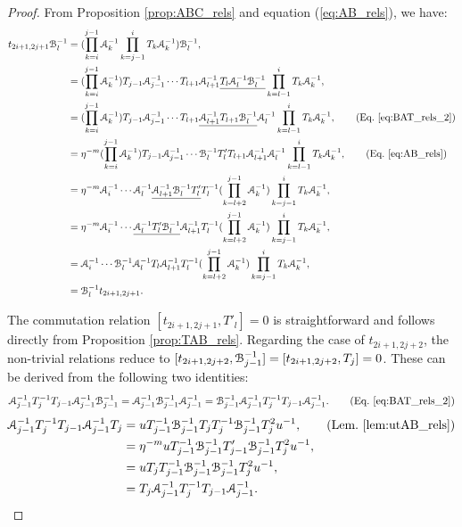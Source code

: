 \documentclass{amsart}
\begin{document}
\begin{proof}
From Proposition \ref{prop:ABC_rels} and equation (\ref{eq:AB_rels}), we have:
\[
\begin{aligned}
t_{2i+1,2j+1}\mathcal{B}^{-1}_l&=(\prod^{j-1}_{k=i}\mathcal{A}^{-1}_k\prod^{i}_{k=j-1}T_k\mathcal{A}^{-1}_k)\mathcal{B}^{-1}_l,\\
&=(\prod^{j-1}_{k=i}\mathcal{A}^{-1}_k)T_{j-1}\mathcal{A}^{-1}_{j-1}\cdots T_{l+1}\mathcal{A}^{-1}_{l+1}\underline{T_{l}\mathcal{A}^{-1}_{l}\mathcal{B}^{-1}_l}\prod^{i}_{k=l-1}T_k\mathcal{A}^{-1}_k, \\ 
&=(\prod^{j-1}_{k=i}\mathcal{A}^{-1}_k)T_{j-1}\mathcal{A}^{-1}_{j-1}\cdots T_{l+1}\underline{\mathcal{A}^{-1}_{l+1}T_{l+1}\mathcal{B}^{-1}_l}\mathcal{A}^{-1}_{l}\prod^{i}_{k=l-1}T_k\mathcal{A}^{-1}_k,\qquad (\text{Eq.~\eqref{eq:BAT_rels_2}}) \\ 
&=\eta^{-m}(\prod^{j-1}_{k=i}\mathcal{A}^{-1}_k)T_{j-1}\mathcal{A}^{-1}_{j-1}\cdots \mathcal{B}^{-1}_lT'_{l}T_{l+1}\mathcal{A}^{-1}_{l+1}\mathcal{A}^{-1}_{l}\prod^{i}_{k=l-1}T_k\mathcal{A}^{-1}_k, \qquad (\text{Eq.~\eqref{eq:AB_rels}}) \\
&=\eta^{-m}\mathcal{A}^{-1}_i\cdots\mathcal{A}^{-1}_{l}\underline{\mathcal{A}^{-1}_{l+1}\mathcal{B}^{-1}_lT'_l}T^{-1}_l(\prod^{j-1}_{k=l+2}\mathcal{A}^{-1}_k)\prod^{i}_{k=j-1}T_k\mathcal{A}^{-1}_k,\\
&=\eta^{-m}\mathcal{A}^{-1}_i\cdots\underline{\mathcal{A}^{-1}_{l}T'_l\mathcal{B}^{-1}_l}\mathcal{A}^{-1}_{l+1}T^{-1}_l(\prod^{j-1}_{k=l+2}\mathcal{A}^{-1}_k)\prod^{i}_{k=j-1}T_k\mathcal{A}^{-1}_k,\\
&=\mathcal{A}^{-1}_i\cdots\mathcal{B}^{-1}_l\mathcal{A}^{-1}_{l}T_l\mathcal{A}^{-1}_{l+1}T^{-1}_l(\prod^{j-1}_{k=l+2}\mathcal{A}^{-1}_k)\prod^{i}_{k=j-1}T_k\mathcal{A}^{-1}_k,\\
&=\mathcal{B}^{-1}_lt_{2i+1,2j+1}.
\end{aligned}
\]

The commutation relation $[t_{2i+1,2j+1},T'_l]=0$ is straightforward and follows directly from Proposition \ref{prop:TAB_rels}.
Regarding the case of $t_{2i+1,2j+2}$, the non-trivial relations reduce to $[t_{2i+1,2j+2},\mathcal{B}^{-1}_{j-1}]=[t_{2i+1,2j+2},T_j]=0$. These can be derived from the following two identities:
\[\mathcal{A}^{-1}_{j-1}T^{-1}_jT_{j-1}\mathcal{A}^{-1}_{j-1}\mathcal{B}^{-1}_{j-1}=\mathcal{A}^{-1}_{j-1}\mathcal{B}^{-1}_{j-1}\mathcal{A}^{-1}_{j-1}=\mathcal{B}^{-1}_{j-1}\mathcal{A}^{-1}_{j-1}T^{-1}_jT_{j-1}\mathcal{A}^{-1}_{j-1}.\qquad (\text{Eq.~\eqref{eq:BAT_rels_2}})
\]
\[
\begin{aligned}
 \mathcal{A}^{-1}_{j-1}T^{-1}_jT_{j-1}\mathcal{A}^{-1}_{j-1}T_{j}&=uT^{-1}_{j-1}\mathcal{B}^{-1}_{j-1}T_jT_j^{-1}\mathcal{B}^{-1}_{j-1}T^2_ju^{-1},\qquad (\text{Lem.~\ref{lem:utAB_rels}})\\
 &=\eta^{-m}uT^{-1}_{j-1}\mathcal{B}^{-1}_{j-1}T'_{j-1}\mathcal{B}^{-1}_{j-1}T^2_ju^{-1},\\
 &=uT_{j}T^{-1}_{j-1}\mathcal{B}^{-1}_{j-1}\mathcal{B}^{-1}_{j-1}T^2_ju^{-1},\\
 &=T_{j}\mathcal{A}^{-1}_{j-1}T^{-1}_jT_{j-1}\mathcal{A}^{-1}_{j-1}.   
\end{aligned}
\]


\end{proof}
\end{document}
